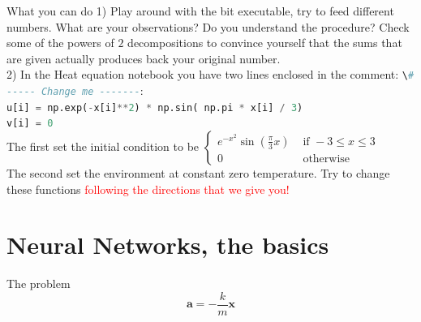 \documentclass[10pt]{beamer}
\newcommand{\red}[1]{\textcolor{red}{#1}}
\newcommand{\ta}{\left(}
\newcommand{\tc}{\right)}
\renewcommand{\[}{\begin{equation*}}
\renewcommand{\]}{\end{equation*}}
\begin{document}
\begin{frame}{What you can do}
1) Play around with the bit executable, try to feed different numbers. What are your observations? Do you understand the procedure? Check some of the powers of $2$ decompositions to convince yourself that the sums that are given actually produces back your original number.\\
2) In the Heat equation notebook you have two lines enclosed in the comment: \lstinline[language=Python]{\# ----- Change me -------}:\\
\lstinline[language=Python]{u[i] = np.exp(-x[i]**2) * np.sin( np.pi * x[i] / 3)}\\
\lstinline[language=Python]{v[i] = 0}\\
The first set the initial condition to be 
$
\begin{cases}
e^{-x^2}\sin\ta\frac{\pi}{3}x\tc & \text{ if } -3\le x\le 3\\
0 & \text{ otherwise }
\end{cases}
$\\
The second set the environment at constant zero temperature. 
Try to change these functions \red{following the directions that we give you!}



\end{frame}

\section{Neural Networks, the basics}

\begin{frame}{The problem}
\huge
\[
\bm{a} = -\frac{k}{m}\bm{x}
\]
\end{frame}
\end{document}
